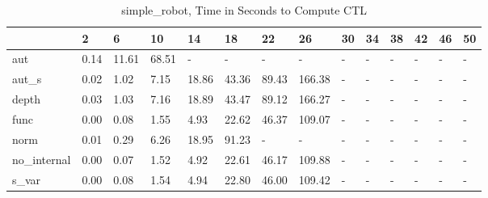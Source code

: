 \begin{table}
\caption{simple_robot, Time in Seconds to Compute CTL}
\label{simple_robot_CTL_time}
\begin{tabular}{llllllllllllll}
\toprule
 & 2 & 6 & 10 & 14 & 18 & 22 & 26 & 30 & 34 & 38 & 42 & 46 & 50 \\
\midrule
aut & 0.14 & 11.61 & 68.51 & - & - & - & - & - & - & - & - & - & - \\
aut_s & 0.02 & 1.02 & 7.15 & 18.86 & 43.36 & 89.43 & 166.38 & - & - & - & - & - & - \\
depth & 0.03 & 1.03 & 7.16 & 18.89 & 43.47 & 89.12 & 166.27 & - & - & - & - & - & - \\
func & 0.00 & 0.08 & 1.55 & 4.93 & 22.62 & 46.37 & 109.07 & - & - & - & - & - & - \\
norm & 0.01 & 0.29 & 6.26 & 18.95 & 91.23 & - & - & - & - & - & - & - & - \\
no_internal & 0.00 & 0.07 & 1.52 & 4.92 & 22.61 & 46.17 & 109.88 & - & - & - & - & - & - \\
s_var & 0.00 & 0.08 & 1.54 & 4.94 & 22.80 & 46.00 & 109.42 & - & - & - & - & - & - \\
\bottomrule
\end{tabular}
\end{table}
